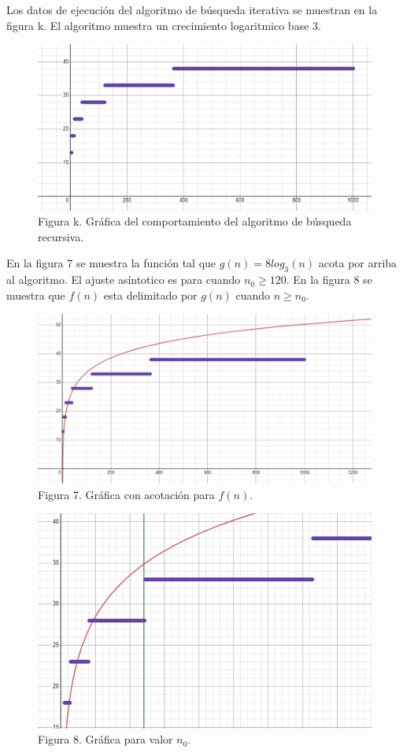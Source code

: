 \documentclass[12pt,twoside]{article}
\begin{document}
Los datos de ejecución del algoritmo de búsqueda iterativa se muestran en la figura k. El algoritmo muestra un
crecimiento logaritmico base 3.
\begin{figure}[h]
  \begin{center}
    \includegraphics[width=0.7\linewidth]{images/busquedarecursivaworstcase.png}
    \\
    Figura k. Gráfica del comportamiento del algoritmo de búsqueda recursiva.
  \end{center}
\end{figure}
\newpage
En la figura 7 se muestra la función tal que $g(n)=8log_3(n)$ acota por arriba al algoritmo. El ajuste asíntotico es para cuando $n_0\geq 120$. En la figura 8 se muestra que $f(n)$ esta delimitado por $g(n)$ cuando $n\geq n_0$.

\begin{figure}[h]
  \begin{center}
    \includegraphics[width=0.7\linewidth]{images/busquedarecursivaworstcasegn.png}
    \\
    Figura 7. Gráfica con acotación para $f(n)$.
  \end{center}
\end{figure}
\begin{figure}[h]
  \begin{center}
    \includegraphics[width=0.5\linewidth]{images/busquedarecursivaworstcasegncota.png}
    \\
    Figura 8. Gráfica para valor $n_0$.
  \end{center}
\end{figure}
\end{document}
